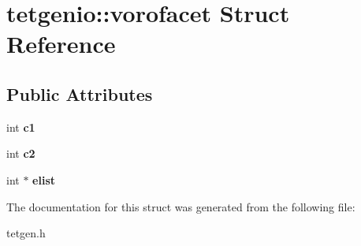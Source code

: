 \hypertarget{structtetgenio_1_1vorofacet}{}\section{tetgenio\+:\+:vorofacet Struct Reference}
\label{structtetgenio_1_1vorofacet}
\subsection*{Public Attributes}
\begin{DoxyCompactItemize}
\item 
\mbox{\label{structtetgenio_1_1vorofacet_a69fcc657a17f0e4565d734fbb34b3239}} 
int {\bfseries c1}
\item 
\mbox{\label{structtetgenio_1_1vorofacet_a368f7dcb47dc65f5655570e942f1e414}} 
int {\bfseries c2}
\item 
\mbox{\label{structtetgenio_1_1vorofacet_a7dc623ea5f4a6006fcc20b2bc8a1f560}} 
int $\ast$ {\bfseries elist}
\end{DoxyCompactItemize}


The documentation for this struct was generated from the following file\+:\begin{DoxyCompactItemize}
\item 
tetgen.\+h\end{DoxyCompactItemize}
